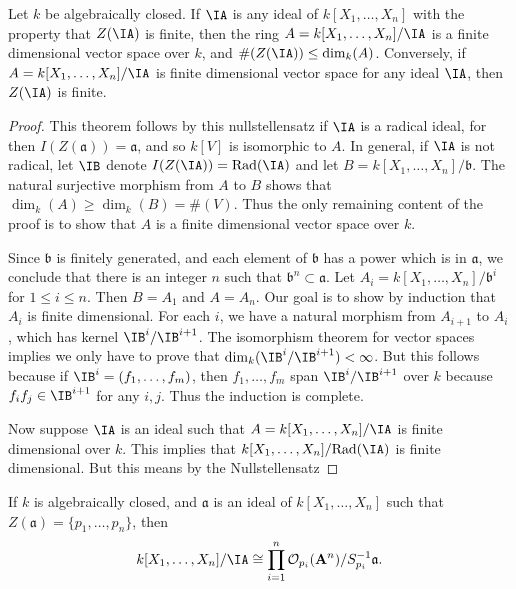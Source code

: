 \begin{lemma}
    Let $k$ be algebraically closed. If $\IA$ is any ideal of $k[X_1,\dots,X_n]$ with the property that $Z(\IA)$ is finite, then the ring $A = k[X_1,\dots,X_n] / \IA$ is a finite dimensional vector space over $k$, and $\#(Z(\IA)) \leq \dim_k(A)$. Conversely, if $A = k[X_1,\dots,X_n] / \IA$ is finite dimensional vector space for any ideal $\IA$, then $Z(\IA)$ is finite.
\end{lemma}
\begin{proof}
    This theorem follows by this nullstellensatz if $\IA$ is a radical ideal, for then $I(Z(\mathfrak{a})) = \mathfrak{a}$, and so $k[V]$ is isomorphic to $A$. In general, if $\IA$ is not radical, let $\IB$ denote $I(Z(\IA)) = \text{Rad}(\IA)$ and let $B = k[X_1,\dots,X_n]/\mathfrak{b}$. The natural surjective morphism from $A$ to $B$ shows that $\dim_k(A) \geq \dim_k(B) = \#(V)$. Thus the only remaining content of the proof is to show that $A$ is a finite dimensional vector space over $k$.

    Since $\mathfrak{b}$ is finitely generated, and each element of $\mathfrak{b}$ has a power which is in $\mathfrak{a}$, we conclude that there is an integer $n$ such that $\mathfrak{b}^n \subset \mathfrak{a}$. Let $A_i = k[X_1,\dots,X_n]/\mathfrak{b}^i$ for $1 \leq i \leq n$. Then $B = A_1$ and $A = A_n$. Our goal is to show by induction that $A_i$ is finite dimensional. For each $i$, we have a natural morphism from $A_{i+1}$ to $A_i$, which has kernel $\IB^i/\IB^{i+1}$. The isomorphism theorem for vector spaces implies we only have to prove that $\dim_k(\IB^i/\IB^{i+1}) < \infty$. But this follows because if $\IB^i = (f_1,\dots,f_m)$, then $f_1,\dots,f_m$ span $\IB^i/\IB^{i+1}$ over $k$ because $f_if_j \in \IB^{i+1}$ for any $i,j$. Thus the induction is complete.

    Now suppose $\IA$ is an ideal such that $A = k[X_1,\dots,X_n]/\IA$ is finite dimensional over $k$. This implies that $k[X_1,\dots,X_n]/\text{Rad}(\IA)$ is finite dimensional. But this means by the Nullstellensatz
\end{proof}

\begin{theorem}
    If $k$ is algebraically closed, and $\mathfrak{a}$ is an ideal of $k[X_1,\dots,X_n]$ such that $Z(\mathfrak{a}) = \{ p_1,\dots,p_n \}$, then
    \[ k[X_1,\dots,X_n]/\IA \cong \prod_{i = 1}^n \mathcal{O}_{p_i}(\mathbf{A}^n) / S_{p_i}^{-1} \mathfrak{a}. \]
\end{theorem}

